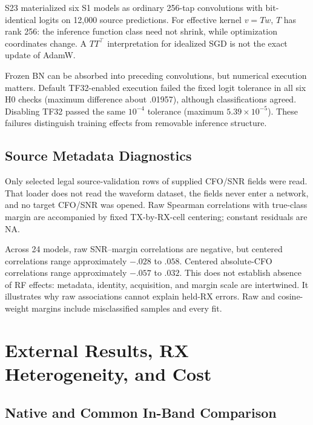 \documentclass[journal]{IEEEtran}
\begin{document}
S23 materialized six S1 models as ordinary 256-tap convolutions with bit-identical logits on 12,000 source predictions. For effective kernel $v=Tw$, $T$ has rank 256: the inference function class need not shrink, while optimization coordinates change. A $TT^\top$ interpretation for idealized SGD is not the exact update of AdamW.

Frozen BN can be absorbed into preceding convolutions, but numerical execution matters. Default TF32-enabled execution failed the fixed logit tolerance in all six H0 checks (maximum difference about .01957), although classifications agreed. Disabling TF32 passed the same $10^{-4}$ tolerance (maximum $5.39\times 10^{-5}$). These failures distinguish training effects from removable inference structure.

\subsection{Source Metadata Diagnostics}
Only selected legal source-validation rows of supplied CFO/SNR fields were read. That loader does not read the waveform dataset, the fields never enter a network, and no target CFO/SNR was opened. Raw Spearman correlations with true-class margin are accompanied by fixed TX-by-RX-cell centering; constant residuals are NA.

Across 24 models, raw SNR--margin correlations are negative, but centered correlations range approximately $-.028$ to $.058$. Centered absolute-CFO correlations range approximately $-.057$ to $.032$. This does not establish absence of RF effects: metadata, identity, acquisition, and margin scale are intertwined. It illustrates why raw associations cannot explain held-RX errors. Raw and cosine-weight margins include misclassified samples and every fit.

\section{External Results, RX Heterogeneity, and Cost}
\subsection{Native and Common In-Band Comparison}
\begin{table}[t]\centering
\caption{Complete S24 comparison on historically developed RXs. Accuracy/F1 are percentages; accuracy is mean $\pm$ fit SD over six fits. Worst is the minimum RX seed-mean accuracy. Strict-IB ASK is deferred, not zero or failed. HStem is the new CPU inference of frozen weights.}
\label{tab:external}
\end{table}
\end{document}
